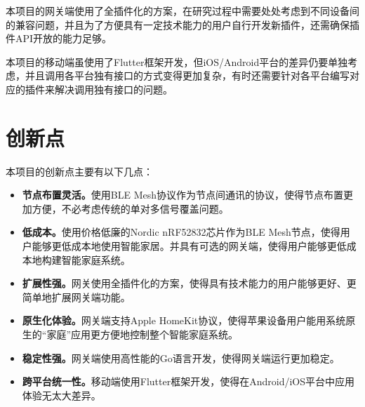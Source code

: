 本项目的网关端使用了全插件化的方案，在研究过程中需要处处考虑到不同设备间的兼容问题，并且为了方便具有一定技术能力的用户自行开发新插件，还需确保插件API开放的能力足够。

本项目的移动端虽使用了Flutter框架开发，但iOS/Android平台的差异仍要单独考虑，并且调用各平台独有接口的方式变得更加复杂，有时还需要针对各平台编写对应的插件来解决调用独有接口的问题。
\section{创新点}
本项目的创新点主要有以下几点：
\begin{itemize}
    \item \textbf{节点布置灵活。}使用BLE Mesh协议作为节点间通讯的协议，使得节点布置更加方便，不必考虑传统的单对多信号覆盖问题。
    \item \textbf{低成本。}使用价格低廉的Nordic nRF52832芯片作为BLE Mesh节点，使得用户能够更低成本地使用智能家居。并具有可选的网关端，使得用户能够更低成本地构建智能家庭系统。
    \item \textbf{扩展性强。}网关使用全插件化的方案，使得具有技术能力的用户能够更好、更简单地扩展网关端功能。
    \item \textbf{原生化体验。}网关端支持Apple HomeKit协议，使得苹果设备用户能用系统原生的“家庭”应用更方便地控制整个智能家庭系统。
    \item \textbf{稳定性强。}网关端使用高性能的Go语言开发，使得网关端运行更加稳定。
    \item \textbf{跨平台统一性。}移动端使用Flutter框架开发，使得在Android/iOS平台中应用体验无太大差异。
\end{itemize}